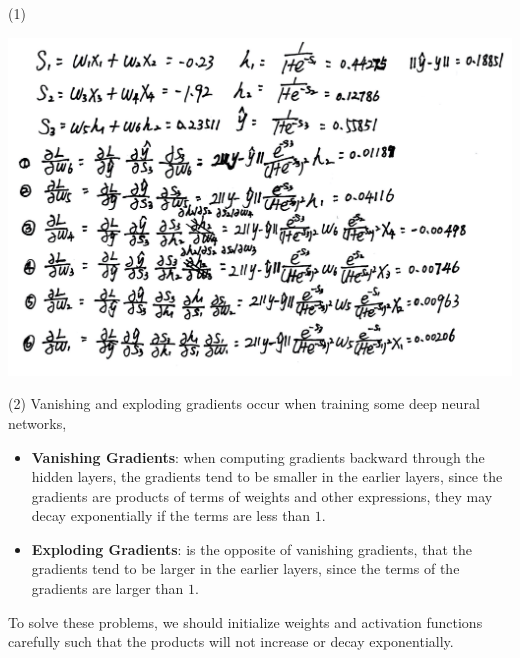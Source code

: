\documentclass[11pt]{article}
\begin{document}
\setcounter{page}{4}

\begin{solution}
\item (1)
\begin{center}
\includegraphics[width=15cm]{3.jpg}
\end{center}
\item (2) Vanishing and exploding gradients occur when training some deep neural networks,
\begin{itemize}
\item \textbf{Vanishing Gradients}: when computing gradients backward through the hidden layers, the gradients tend to be smaller in the earlier layers, since the gradients are products of terms of weights and other expressions, they may decay exponentially if the terms are less than $1$.
\item \textbf{Exploding Gradients}: is the opposite of vanishing gradients, that the gradients tend to be larger in the earlier layers, since the terms of the gradients are larger than $1$.
\end{itemize}
To solve these problems, we should initialize weights and activation functions carefully such that the products will not increase or  decay exponentially.
\end{solution}


\setcounter{page}{5}
\end{document}
